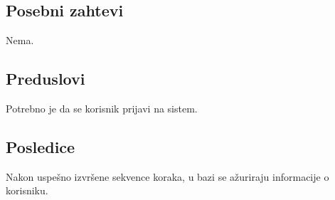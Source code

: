\documentclass[a4paper,12pt]{report}
\begin{document}
\subsection{Posebni zahtevi}
    Nema.
\subsection{Preduslovi}
    Potrebno je da se korisnik prijavi na sistem. 
\subsection{Posledice}
    Nakon uspešno izvršene sekvence koraka, u bazi se ažuriraju informacije o korisniku.
\end{document}
